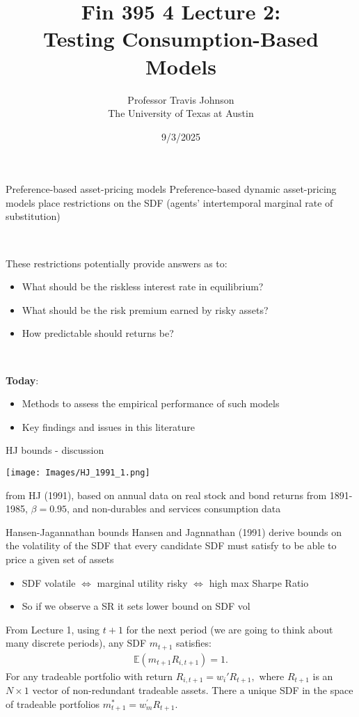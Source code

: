 \documentclass[xcolor=table, aspectratio=169]{beamer}
\title[Testing consumption-based models]{Fin 395 4 Lecture 2: \\ Testing Consumption-Based Models}
\author[Empirical Asset Pricing (Johnson)]{Professor Travis Johnson \\ The University of Texas at Austin }
\date{9/3/2025}
\newcommand{\E}{\mathbb{E}}
\newcommand{\alertbf}[1]{\alert{\textbf{#1}}}
\begin{document}
\begin{frame}
  \titlepage 
\end{frame}


\begin{frame}{Preference-based asset-pricing models}
Preference-based dynamic asset-pricing models place restrictions on the SDF (agents' intertemporal marginal rate of substitution)

~

These restrictions potentially provide answers as to:
\begin{itemize}
\item What should be the riskless interest rate in equilibrium?
\item What should be the risk premium earned by risky assets?
\item How predictable should returns be?
\end{itemize}

~

\alertbf{Today}:
\begin{itemize}
\item Methods to assess the empirical performance of such models
\item Key findings and issues in this literature
\end{itemize}
\end{frame}


\begin{frame}{HJ bounds - discussion}

\begin{center}
\texttt{[image: Images/HJ\_1991\_1.png]}
\end{center}

from HJ (1991), based on annual data on real stock and bond returns from 1891-1985, $\beta = 0.95$, and non-durables and services consumption data
\end{frame}


\begin{frame}{Hansen-Jagannathan bounds}
Hansen and Jagnnathan (1991) derive bounds on the volatility of the SDF that every candidate SDF must satisfy to be able to price a given set of assets
\begin{small}
\begin{itemize}
\item SDF volatile $\Leftrightarrow$ marginal utility risky $\Leftrightarrow$ high max Sharpe Ratio
\item So if we observe a SR it sets lower bound on SDF vol
\end{itemize}
\end{small}

From Lecture 1, using $t+1$ for the next period (we are going to think about many discrete periods), any SDF $m_{t+1}$ satisfies:
\begin{align*}  
\E(m_{t+1} R_{i,t+1}) = 1.
\end{align*}
For any tradeable portfolio with return $R_{i,t+1} = w_i'R_{t+1},$ where $R_{t+1}$ is an $N \times 1$ vector of non-redundant tradeable assets. There a unique SDF in the space of tradeable portfolios $m_{t+1}^* = w_m^{'}R_{t+1}$.

\end{frame}
\end{document}
